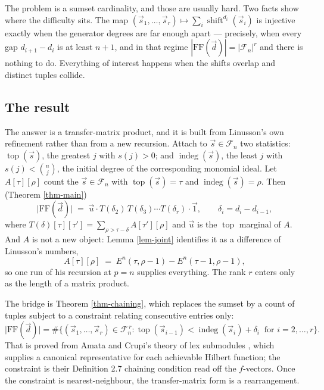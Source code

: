 \documentclass[11pt, a4paper, abstract=yes]{scrartcl}
\theoremstyle{definition}
\theoremstyle{remark}
\theoremstyle{plain}
\newcommand{\shift}{\operatorname{shift}}
\newcommand{\indeg}{\operatorname{indeg}}
\newcommand{\tp}{\operatorname{top}}
\begin{document}
The problem is a sumset cardinality, and those are usually hard. Two facts show where the difficulty
sits. The map \((\vec s_1,\dots,\vec s_r)\mapsto\sum_i\shift^{d_i}(\vec s_i)\) is injective exactly when the
generator degrees are far enough apart --- precisely, when every gap \(d_{i+1}-d_i\) is at least
\(n+1\), and in that regime \(|\mathrm{FF}(\vec d)|=|\mathcal F_n|^r\) and there is nothing to do.
Everything of interest happens when the shifts overlap and distinct tuples collide.
\subsection{The result}
\label{sec:orgc502b9c}

The answer is a transfer-matrix product, and it is built from Linusson's own refinement rather than
from a new recursion. Attach to \(\vec s\in\mathcal F_n\) two statistics: \(\tp(\vec s)\), the greatest \(j\)
with \(s(j)>0\); and \(\indeg(\vec s)\), the least \(j\) with \(s(j)<\binom nj\), the initial degree
of the corresponding monomial ideal. Let \(A[\tau][\rho]\) count the \(\vec s\in\mathcal F_n\) with
\(\tp(\vec s)=\tau\) and \(\indeg(\vec s)=\rho\). Then (Theorem \ref{thm-main})
\begin{equation}\label{eq:auto-3}
  \lvert\mathrm{FF}(\vec d)\rvert\;=\;\vec u\cdot T(\delta_2)\,T(\delta_3)\cdots T(\delta_r)\cdot\vec 1,
  \qquad \delta_i=d_i-d_{i-1},
\end{equation}
where \(T(\delta)[\tau][\tau']=\sum_{\rho>\tau-\delta}A[\tau'][\rho]\) and \(\vec u\) is the \(\tp\)
marginal of \(A\). And \(A\) is not a new object: Lemma \ref{lem-joint} identifies it as a difference of
Linusson's numbers,
\begin{equation}\label{eq:auto-4}
  A[\tau][\rho]\;=\;E^n(\tau,\rho-1)-E^n(\tau-1,\rho-1),
\end{equation}
so one run of his recursion at \(p=n\) supplies everything. The rank \(r\) enters only as the length
of a matrix product.

The bridge is Theorem \ref{thm-chaining}, which replaces the sumset by a count of tuples subject to a
constraint relating consecutive entries only:
\begin{equation}\label{eq:auto-5}
  \lvert\mathrm{FF}(\vec d)\rvert=\#\bigl\lbrace(\vec s_1,\dots,\vec s_r)\in\mathcal F_n^{\,r}:
   \tp(\vec s_{i-1})<\indeg(\vec s_i)+\delta_i\ \text{ for } i=2,\dots,r\bigr\rbrace .
\end{equation}
That is proved from Amata and Crupi's theory of lex submodules \autocite{AmataCrupi2020,AmataCrupi2020KK}, which supplies a canonical
representative for each achievable Hilbert function; the constraint is their Definition 2.7 chaining
condition read off the \(f\)-vectors. Once the constraint is nearest-neighbour, the transfer-matrix
form is a rearrangement.
\end{document}
